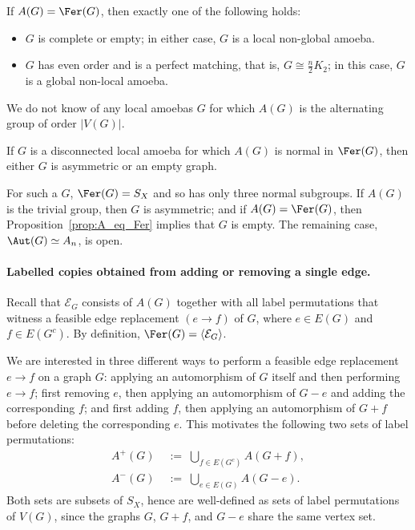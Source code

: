 \begin{proposition}\label{prop:A_eq_Fer}
    If $A(G)=\Fer(G)$, then exactly one of the following holds:
    \begin{itemize}
        \item $G$ is complete or empty; in either case, $G$ is a local non-global amoeba.
        \item $G$ has even order and is a perfect matching, that is, $G\cong\frac n2K_2$; in this case, $G$ is a global non-local amoeba.
    \end{itemize}
\end{proposition}

We do not know of any local amoebas $G$ for which $A(G)$ is the alternating group of order $|V(G)|$.

\begin{conjecture}\label{conj:disconnected-A-normal}
    If $G$ is a disconnected local amoeba for which $A(G)$ is normal in $\Fer(G)$, then either $G$ is asymmetric or an empty graph.
\end{conjecture}

For such a $G$, $\Fer(G)=S_X$ and so has only three normal subgroups.
If $A(G)$ is the trivial group, then $G$ is asymmetric; and if $A(G)=\Fer(G)$, then Proposition~\ref{prop:A_eq_Fer} implies that $G$ is empty.
The remaining case, $\Aut(G)\simeq A_n$, is open.

\paragraph{Labelled copies obtained from adding or removing a single edge.}

Recall that $\mathcal E_G$ consists of $A(G)$ together with all label permutations that witness a feasible edge replacement $(e\to f)$ of $G$, where $e\in E(G)$ and $f\in E(G^c)$.
By definition, $\Fer(G)=\langle\mathcal E_G\rangle$.

We are interested in three different ways to perform a feasible edge replacement $e\to f$ on a graph $G$: applying an automorphism of $G$ itself and then performing $e\to f$; first removing $e$, then applying an automorphism of $G-e$ and adding the corresponding $f$; and first adding $f$, then applying an automorphism of $G+f$ before deleting the corresponding $e$.
This motivates the following two sets of label permutations:
\begin{align*}
    A^+(G) &\;:=\;\bigcup_{f\in E(G^c)}A(G+f),\\
    A^-(G) &\;:=\;\bigcup_{e\in E(G)}A(G-e).
\end{align*}
Both sets are subsets of $S_X$, hence are well-defined as sets of label permutations of $V(G)$, since the graphs $G$, $G+f$, and $G-e$ share the same vertex set.

